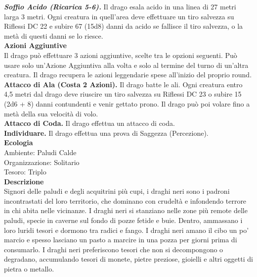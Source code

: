 \begin{multicols}{2}
\emph{\textbf{Soffio Acido (Ricarica 5-6).}} Il drago esala acido in una linea di 27 metri larga 3 metri. Ogni creatura in quell'area deve effettuare un tiro salvezza su Riflessi DC 22 e subire 67 (15d8) danni da acido se fallisce il tiro salvezza, o la metà di questi danni se lo riesce.\\
\textbf{Azioni Aggiuntive}\\
Il drago può effettuare 3 azioni aggiuntive, scelte tra le opzioni seguenti. Può usare solo un'Azione Aggiuntiva alla volta e solo al termine del turno di un'altra creatura. Il drago recupera le azioni leggendarie spese all'inizio del proprio round.\\
\textbf{Attacco di Ala (Costa 2 Azioni).} Il drago batte le ali. Ogni creatura entro 4,5 metri dal drago deve riuscire un tiro salvezza su Riflessi DC 23 o subire 15 (2d6 + 8) danni contundenti e venir gettato prono. Il drago può poi volare fino a metà della sua velocità di volo.\\
\textbf{Attacco di Coda.} Il drago effettua un attacco di coda.  \\
\textbf{Individuare.} Il drago effettua una prova di Saggezza (Percezione).\\
\textbf{Ecologia}\\
Ambiente: Paludi Calde\\
Organizzazione: Solitario\\
Tesoro: Triplo\\
\textbf{Descrizione}\\
Signori delle paludi e degli acquitrini più cupi, i draghi neri sono i padroni incontrastati del loro territorio, che dominano con crudeltà e infondendo terrore in chi abita nelle vicinanze. I draghi neri si stanziano nelle zone più remote delle paludi, specie in caverne sul fondo di pozze fetide e buie. Dentro, ammassano i loro luridi tesori e dormono tra radici e fango. I draghi neri amano il cibo un po’ marcio e spesso lasciano un pasto a marcire in una pozza per giorni prima di consumarlo. I draghi neri preferiscono tesori che non si decompongono o degradano, accumulando tesori di monete, pietre preziose, gioielli e altri oggetti di pietra o metallo.\\


\end{multicols}
